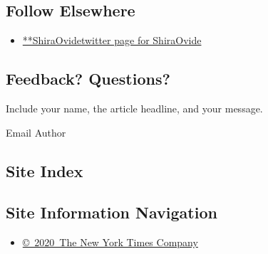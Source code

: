 \hypertarget{follow-elsewhere}{%
\subsection{Follow Elsewhere}\label{follow-elsewhere}}

\begin{itemize}
\tightlist
\item
  \href{https://twitter.com/ShiraOvide}{**ShiraOvidetwitter page for
  ShiraOvide}
\end{itemize}

\hypertarget{feedback-questions}{%
\subsection{Feedback? Questions?}\label{feedback-questions}}

Include your name, the article headline, and your message.

Email Author

\hypertarget{site-index}{%
\subsection{Site Index}\label{site-index}}

\hypertarget{site-information-navigation}{%
\subsection{Site Information
Navigation}\label{site-information-navigation}}

\begin{itemize}
\tightlist
\item
  \href{https://help.nytimes3xbfgragh.onion/hc/en-us/articles/115014792127-Copyright-notice}{©~2020~The
  New York Times Company}
\end{itemize}

